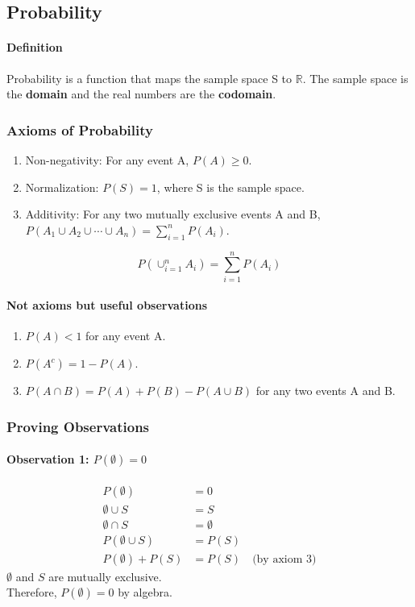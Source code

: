 \subsection{Probability}
\hrulefill

\paragraph*{Definition}
Probability is a function that maps the sample space S to $\mathbb{R}$. The sample space is the 
\textbf{domain} and the real numbers are the \textbf{codomain}.

\subsubsection*{Axioms of Probability}
\begin{enumerate}
    \item Non-negativity: For any event A, $P(A) \geq 0$.
    \item Normalization: $P(S) = 1$, where S is the sample space.
    \item Additivity: For any two mutually exclusive events A and B, $P(A_1 \cup A_2 \cup \cdots \cup A_n) = \sum_{i=1}^{n} P(A_i)$.
\end{enumerate}

\begin{equation*}
    P(\cup_{i=1}^{n} A_i) = \sum_{i=1}^{n} P(A_i)
\end{equation*}

\paragraph*{Not axioms but useful observations}
\begin{enumerate}
    \item $P(A) < 1$ for any event A.
    \item $P(A^c) = 1 - P(A)$.
    \item $P(A \cap B) = P(A) + P(B) - P(A \cup B)$ for any two events A and B.
\end{enumerate}

\subsubsection*{Proving Observations}

\paragraph*{Observation 1: $P(\emptyset) = 0$}
\begin{align*}
    P(\emptyset) &= 0 \\
    \emptyset \cup S &= S \\
    \emptyset \cap S &= \emptyset \\
    P(\emptyset \cup S) &= P(S) \\
    P(\emptyset) + P(S) &= P(S) \quad \text{(by axiom 3)}
\end{align*}
\noindent
$\emptyset$ and $S$ are mutually exclusive.\\
Therefore, $P(\emptyset) = 0$ by algebra.

